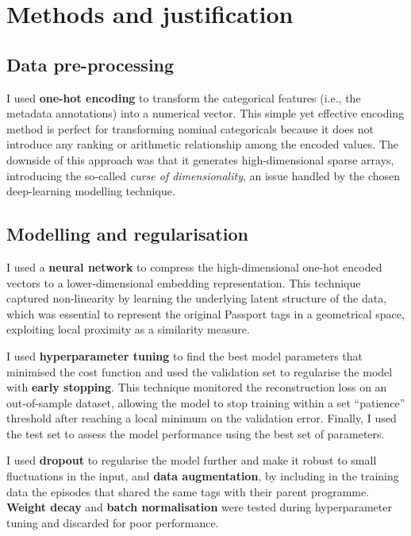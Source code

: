
\section{Methods and justification}

\subsection{Data pre-processing}

I used \textbf{one-hot encoding} to transform the categorical features (i.e., the metadata annotations) into a numerical vector.
This simple yet effective encoding method is perfect for transforming nominal categoricals because it does not introduce
any ranking or arithmetic relationship among the encoded values.
The downside of this approach was that it generates high-dimensional sparse arrays,
introducing the so-called \textit{curse of dimensionality}, an issue handled by the chosen deep-learning modelling technique.

\subsection{Modelling and regularisation}

I used a \textbf{neural network} to compress the high-dimensional one-hot encoded vectors to a lower-dimensional embedding representation.
This technique captured non-linearity by learning the underlying latent structure of the data,
which was essential to represent the original Passport tags in a geometrical space,
exploiting local proximity as a similarity measure.

I used \textbf{hyperparameter tuning} to find the best model parameters
that minimised the cost function and used the validation set to regularise the model with \textbf{early stopping}.
This technique monitored the reconstruction loss on an out-of-sample dataset,
allowing the model to stop training within a set ``patience'' threshold after reaching a local minimum on the validation error.
Finally, I used the test set to assess the model performance using the best set of parameters.

I used \textbf{dropout} to regularise the model further and make it robust to small fluctuations in the input,
and \textbf{data augmentation}, by including in the training data the episodes that shared the same tags with their parent programme.
\textbf{Weight decay} and \textbf{batch normalisation} were tested during hyperparameter tuning and discarded for poor performance.

